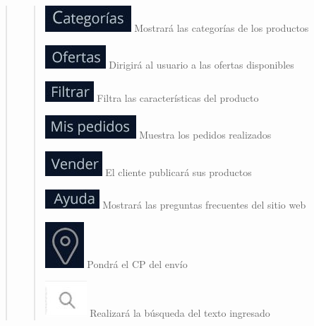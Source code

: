 \documentclass[14pt]{article}
\begin{document}
\begin{quote}
\begin{quote}
                            \includegraphics[height=0.02\textwidth]{BotonCategorias.jpg}
                            \label{P4:BotonCategorias} Mostrará las categorías de los productos
                           
                            \includegraphics[height=0.02\textwidth]{BotonOfertas.jpg}
                            \label{P4:BotonOfertas} Dirigirá al usuario a las ofertas disponibles
                            
                            \includegraphics[height=0.02\textwidth]{BotonFiltrar.jpg}
                            \label{P4:BotonFiltrar} Filtra las características del producto
                            
                            \includegraphics[height=0.02\textwidth]{BotonMisPedidos.jpg}
                            \label{P4:BotonMisPedidos} Muestra los pedidos realizados
                           
                            \includegraphics[height=0.02\textwidth]{BotonVender.jpg}
                            \label{P4:BotonVender} El cliente publicará sus productos
                            
                            \includegraphics[height=0.02\textwidth]{BotonAyuda.jpg}
                            \label{P4:BotonAyuda} Mostrará las preguntas frecuentes del sitio web
                            
                            \includegraphics[height=0.02\textwidth]{BotonUbicacion.jpg}
                            \label{P4:BotonUbicacion} Pondrá el CP del envío
                            
                            \includegraphics[height=0.02\textwidth]{BotonBuscar.jpg}
                            \label{P4:BotonBuscar} Realizará la búsqueda del texto ingresado
                            

\end{quote}
\end{quote}
\end{document}
